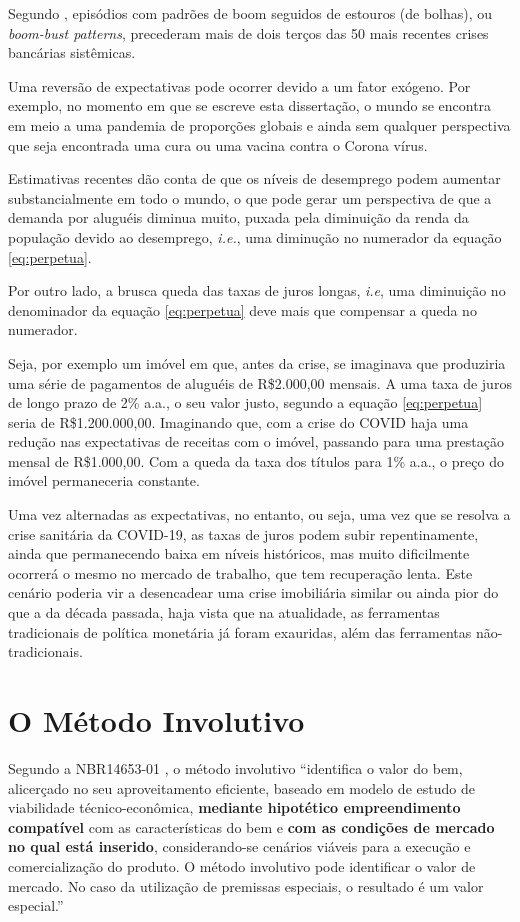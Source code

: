 \documentclass[
	12pt,				%
	oneside,			%
	a4paper,			%
	chapter=TITLE,		%
	section=TITLE,		%
	english,			%
	brazil				%
	]{abntex2}
\begin{document}
Segundo \textcite{fmiera}, episódios com padrões de boom seguidos de estouros (de bolhas),
ou \emph{boom-bust patterns}, precederam mais de dois terços das 50 mais recentes
crises bancárias sistêmicas.

Uma reversão de expectativas pode ocorrer devido a um fator exógeno. Por exemplo,
no momento em que se escreve esta dissertação, o mundo se encontra em meio a
uma pandemia de proporções globais e ainda sem qualquer perspectiva que seja
encontrada uma cura ou uma vacina contra o Corona vírus.

Estimativas recentes dão conta de que os níveis de desemprego podem aumentar
substancialmente em todo o mundo, o que pode gerar um perspectiva de que a
demanda por aluguéis diminua muito, puxada pela diminuição da renda da
população devido ao desemprego, \emph{i.e.}, uma diminução no numerador da equação
\eqref{eq:perpetua}.

Por outro lado, a brusca queda das taxas de juros longas, \emph{i.e}, uma diminuição
no denominador da equação \eqref{eq:perpetua} deve mais que compensar a queda no
numerador.

Seja, por exemplo um imóvel em que, antes da crise, se imaginava que produziria
uma série de pagamentos de aluguéis de R\$2.000,00 mensais. A uma taxa de juros
de longo prazo de 2\% a.a., o seu valor justo, segundo a equação
\eqref{eq:perpetua} seria de R\$1.200.000,00. Imaginando que, com a crise do COVID
haja uma redução nas expectativas de receitas com o imóvel, passando para uma
prestação mensal de R\$1.000,00. Com a queda da taxa dos títulos para 1\% a.a.,
o preço do imóvel permaneceria constante.

Uma vez alternadas as expectativas, no entanto, ou seja, uma vez que se resolva
a crise sanitária da COVID-19, as taxas de juros podem subir repentinamente,
ainda que permanecendo baixa em níveis históricos, mas muito dificilmente
ocorrerá o mesmo no mercado de trabalho, que tem recuperação lenta. Este cenário
poderia vir a desencadear uma crise imobiliária similar ou ainda pior do que a
da década passada, haja vista que na atualidade, as ferramentas tradicionais de
política monetária já foram exauridas, além das ferramentas não-tradicionais.

\hypertarget{involutivo}{%
\chapter{O Método Involutivo}\label{involutivo}}

Segundo a NBR14653-01 \autocite*[14]{NBR1465301}, o método involutivo ``identifica o
valor do bem, alicerçado no seu aproveitamento eficiente, baseado em modelo de
estudo de viabilidade técnico-econômica, \textbf{mediante hipotético empreendimento
compatível} com as características do bem e \textbf{com as condições de mercado no
qual está inserido}, considerando-se cenários viáveis para a execução e
comercialização do produto. O método involutivo pode identificar o valor de
mercado. No caso da utilização de premissas especiais, o resultado é um valor
especial.''
\end{document}
